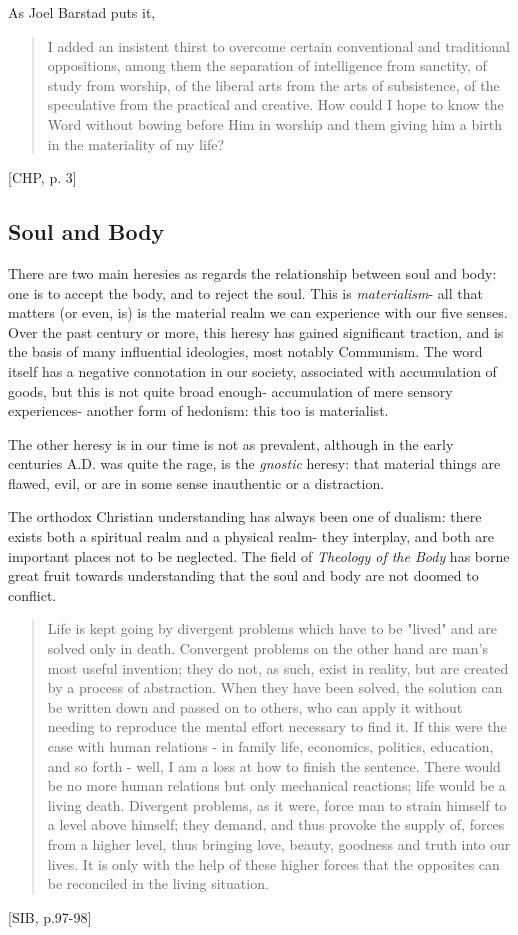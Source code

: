 \documentclass[letterpaper]{article}
\begin{document}
As Joel Barstad puts it,

\begin{quote}
  I added an insistent thirst to overcome certain conventional and traditional oppositions, among them the separation of intelligence from sanctity, of study from worship, of the liberal arts from the arts of subsistence, of the speculative from the practical and creative. How could I hope to know the Word without bowing before Him in worship and them giving him a birth in the materiality of my life?
\end{quote} [CHP, p. 3]

\subsection{Soul and Body}

There are two main heresies as regards the relationship between soul and body: one is to accept the body, and to reject the soul. This is \textit{materialism}- all that matters (or even, is) is the material realm we can experience with our five senses. Over the past century or more, this heresy has gained significant traction, and is the basis of many influential ideologies, most notably Communism. The word itself has a negative connotation in our society, associated with accumulation of goods, but this is not quite broad enough- accumulation of mere sensory experiences- another form of hedonism: this too is materialist.

The other heresy is in our time is not as prevalent, although in the early centuries A.D. was quite the rage, is the \textit{gnostic} heresy: that material things are flawed, evil, or are in some sense inauthentic or a distraction.

The orthodox Christian understanding has always been one of dualism: there exists both a spiritual realm and a physical realm- they interplay, and both are important places not to be neglected. The field of \textit{Theology of the Body} has borne great fruit towards understanding that the soul and body are not doomed to conflict.

\begin{quote}
  Life is kept going by divergent problems which have to be "lived" and are solved only in death. Convergent problems on the other hand are man's most useful invention; they do not, as such, exist in reality, but are created by a process of abstraction. When they have been solved, the solution can be written down and passed on to others, who can apply it without needing to reproduce the mental effort necessary to find it. If this were the case with human relations - in family life, economics, politics, education, and so forth - well, I am a loss at how to finish the sentence. There would be no more human relations but only mechanical reactions; life would be a living death. Divergent problems, as it were, force man to strain himself to a level above himself; they demand, and thus provoke the supply of, forces from a higher level, thus bringing love, beauty, goodness and truth into our lives. It is only with the help of these higher forces that the opposites can be reconciled in the living situation.
\end{quote} [SIB, p.97-98]
\end{document}
